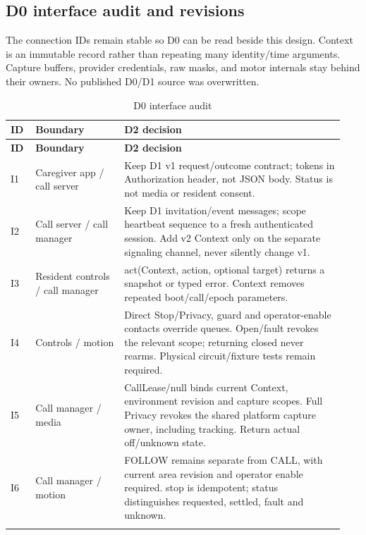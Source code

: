 \documentclass[12pt,letterpaper]{article}
\begin{document}
\subsection*{D0 interface audit and revisions}
The connection IDs remain stable so D0 can be read beside this design. Context is an immutable record rather than repeating many identity/time arguments. Capture buffers, provider credentials, raw masks, and motor internals stay behind their owners. No published D0/D1 source was overwritten.

\begingroup\small
\begin{longtable}{@{}>{\RaggedRight\arraybackslash}p{0.07\linewidth}>{\RaggedRight\arraybackslash}p{0.25\linewidth}>{\RaggedRight\arraybackslash}p{0.62\linewidth}@{}}
\caption{D0 interface audit}\\
\toprule\textbf{ID} & \textbf{Boundary} & \textbf{D2 decision}\\\midrule\endfirsthead
\toprule\textbf{ID} & \textbf{Boundary} & \textbf{D2 decision}\\\midrule\endhead
\midrule\endfoot\bottomrule\endlastfoot
I1 & Caregiver app / call server & Keep D1 v1 request/outcome contract; tokens in Authorization header, not JSON body. Status is not media or resident consent. \\ \addlinespace[3pt]
I2 & Call server / call manager & Keep D1 invitation/event messages; scope heartbeat sequence to a fresh authenticated session. Add v2 Context only on the separate signaling channel, never silently change v1. \\ \addlinespace[3pt]
I3 & Resident controls / call manager & act(Context, action, optional target) returns a snapshot or typed error. Context removes repeated boot/call/epoch parameters. \\ \addlinespace[3pt]
I4 & Controls / motion & Direct Stop/Privacy, guard and operator-enable contacts override queues. Open/fault revokes the relevant scope; returning closed never rearms. Physical circuit/fixture tests remain required. \\ \addlinespace[3pt]
I5 & Call manager / media & CallLease/null binds current Context, environment revision and capture scopes. Full Privacy revokes the shared platform capture owner, including tracking. Return actual off/unknown state. \\ \addlinespace[3pt]
I6 & Call manager / motion & FOLLOW remains separate from CALL, with current area revision and operator enable required. stop is idempotent; status distinguishes requested, settled, fault and unknown. \\ \addlinespace[3pt]

\end{longtable}
\end{document}
